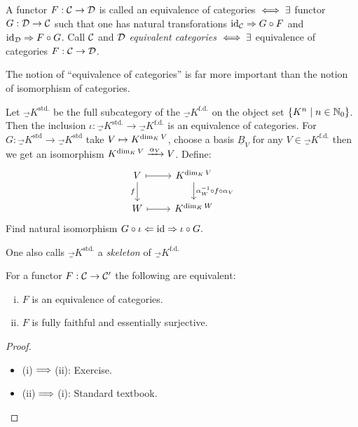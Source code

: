 \documentclass[a4paper]{report}
\begin{document}
\begin{defi}
A functor $F: \mathcal{C} \to \mathcal{D}$ is called an equivalence of categories $\iff \exists$ functor $G: \mathcal{D} \to \mathcal{C}$ such that one has natural transforations $\operatorname{id}_{\mathcal{C}} \Rightarrow G \circ F$ and $\operatorname{id}_{\mathcal{D}} \Rightarrow F \circ G$. Call $\mathcal{C}$ and $\mathcal{D}$ \emph{equivalent categories} $\iff \exists$ equivalence of categories $F: \mathcal{C} \to \mathcal{D}$.
\end{defi}
\begin{rem*}
The notion of ``equivalence of categories'' is far more important than the notion of isomorphism of categories.
\end{rem*}


\begin{exmp*}
  Let $\Vec_{K}^{\text{std.}}$ be the full subcategory of the $\Vec_{K}^{\text{f.d.}}$ on the object set $\{K^{n} \mid n \in \mathbb{N}_0\}$. Then the inclusion $\iota: \Vec_{K}^{\text{std.}} \to \Vec_{K}^{\text{f.d.}}$ is an equivalence of categories. For $G: \Vec_{K}^{\text{std}} \to \Vec_{K}^{\text{std}}$ take $V \mapsto K^{\dim_{K} V}$, choose a basis $\underline B_{V}$ for any $V \in \Vec_{K}^{\text{f.d.}}$ then we get an isomorphism $K^{\dim_{K} V} \xrightarrow{\alpha_{V}} V$. Define:
  \[\begin{tikzcd}
      V \arrow[d, "f"'] \arrow [r, mapsto] & K^{\dim_{K} V} \arrow[d, "\alpha_{W}^{-1} \circ f \circ \a_{V}"] \\
      W \arrow [r, mapsto]& K^{\dim_{K} W}
    \end{tikzcd}\]
  Find natural isomorphism $G \circ \iota \Leftarrow \operatorname{id} \Rightarrow \iota \circ G.$
\end{exmp*}

\begin{rem*}
One also calls $\Vec_{K}^{\text{std.}}$ a \emph{skeleton} of $\Vec_{K}^{\text{f.d.}}$
\end{rem*}

\begin{thm}
  For a functor $F: \mathcal{C} \to \mathcal{C}'$ the following are equivalent:
  \begin{enumerate}[(i)]
    \item $F$ is an equivalence of categories.
    \item $F$ is fully faithful and essentially surjective.
  \end{enumerate}
\end{thm}
\begin{proof}
\begin{itemize}
  \item (i)$\implies$(ii): Exercise.
        \item (ii)$\implies$(i): Standard textbook. \qedhere
\end{itemize}
\end{proof}
\end{document}
